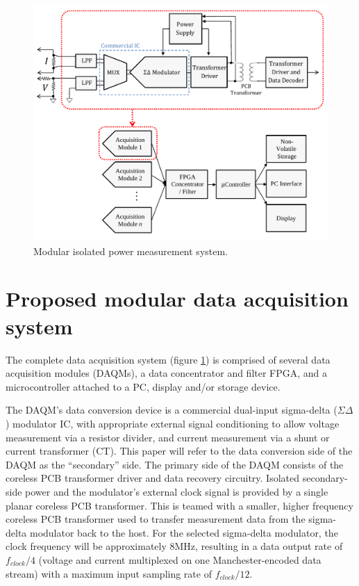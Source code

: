 \documentclass[conference]{IEEEtran}
\begin{document}
\begin{figure}[t]
	\centering
	\includegraphics[width=1.0\columnwidth]{./img/FullSystem_BasicCol}
	\caption{Modular isolated power measurement system.}
	\label{fig:FullSystem}
\end{figure}

\section{Proposed modular data acquisition system}
The complete data acquisition system (figure \ref{fig:FullSystem}) is comprised of several data acquisition modules (DAQMs), a data concentrator and filter FPGA, and a microcontroller attached to a PC, display and/or storage device.

The DAQM's data conversion device is a commercial dual-input sigma-delta ($\Sigma\Delta$) modulator IC, with appropriate external signal conditioning to allow voltage measurement via a resistor divider, and current measurement via a shunt or current transformer (CT).  This paper will refer to the data conversion side of the DAQM as the ``secondary'' side.  The primary side of the DAQM consists of the coreless PCB transformer driver and data recovery circuitry.  Isolated secondary-side power and the modulator's external clock signal is provided by a single planar coreless PCB transformer.  This is teamed with a smaller,  higher frequency coreless PCB transformer used to transfer measurement data from the sigma-delta modulator back to the host.  For the selected sigma-delta modulator, the clock frequency will be approximately 8MHz, resulting in a data output rate of $ f_{clock}/4 $ (voltage and current multiplexed on one Manchester-encoded data stream) with a maximum input sampling rate of $ f_{clock}/12 $.
\end{document}
